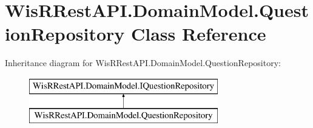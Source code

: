 \hypertarget{class_wis_r_rest_a_p_i_1_1_domain_model_1_1_question_repository}{}\section{Wis\+R\+Rest\+A\+P\+I.\+Domain\+Model.\+Question\+Repository Class Reference}
\label{class_wis_r_rest_a_p_i_1_1_domain_model_1_1_question_repository}
Inheritance diagram for Wis\+R\+Rest\+A\+P\+I.\+Domain\+Model.\+Question\+Repository\+:\begin{figure}[H]
\begin{center}
\leavevmode
\includegraphics[height=2.000000cm]{class_wis_r_rest_a_p_i_1_1_domain_model_1_1_question_repository}
\end{center}
\end{figure}
